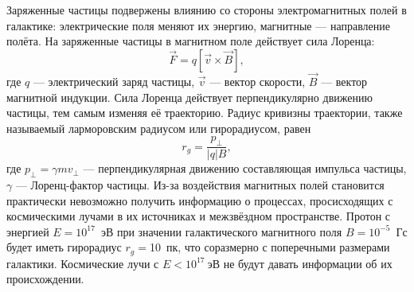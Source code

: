 \documentclass[magd,floatypics,numeref]{msudipl} %
\begin{document}
Заряженные частицы подвержены влиянию со стороны электромагнитных полей в галактике: электрические поля меняют их энергию, магнитные --- направление полёта. На заряженные частицы в магнитном поле действует сила Лоренца:
\begin{equation}
\vec F = q\left[\vec v\times \vec B\right],
\end{equation}
где $q$ --- электрический заряд частицы, $\vec v$ --- вектор скорости, $\vec B$ --- вектор магнитной индукции. Сила Лоренца действует перпендикулярно движению частицы, тем самым изменяя её траекторию. Радиус кривизны траектории, также называемый ларморовским радиусом или гирорадиусом, равен
\begin{equation}
r_g = \frac{p_{\bot}}{|q|B},
\end{equation}
где $p_{\bot}=\gamma m v_{\bot}$ --- перпендикулярная движению составляющая импульса частицы, $\gamma$ --- Лоренц-фактор частицы. Из-за воздействия магнитных полей становится практически невозможно получить информацию о процессах, просисходящих с космическими лучами в их источниках и межзвёздном пространстве. Протон с энергией $E=10^{17}$~эВ при значении галактического магнитного поля $B=10^{-5}$~Гс будет иметь гирорадиус $r_g=$10~пк, что соразмерно с поперечными размерами галактики. Космические лучи с $E<10^{17}~$эВ не будут давать информации об их происхождении. 
\end{document}
